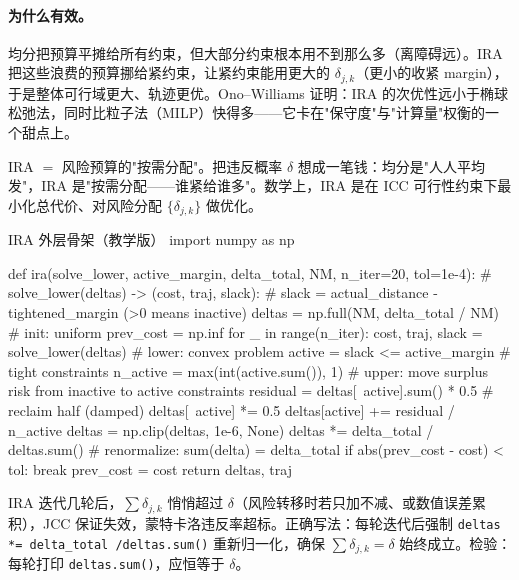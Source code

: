 \paragraph{为什么有效。}
均分把预算平摊给所有约束，但大部分约束根本用不到那么多（离障碍远）。IRA 把这些浪费的预算挪给紧约束，让紧约束能用更大的 $\delta_{j,k}$（更小的收紧 margin），于是整体可行域更大、轨迹更优。Ono--Williams\cite{ono2008iterative} 证明：IRA 的次优性远小于椭球松弛法，同时比粒子法（MILP）快得多——它卡在"保守度"与"计算量"权衡的一个甜点上。

\begin{insight}
IRA $=$ 风险预算的"按需分配"。把违反概率 $\delta$ 想成一笔钱：均分是"人人平均发"，IRA 是"按需分配——谁紧给谁多"。数学上，IRA 是在 ICC 可行性约束下最小化总代价、对风险分配 $\{\delta_{j,k}\}$ 做优化。
\end{insight}

\begin{codebox}[Python]{IRA 外层骨架（教学版）}
import numpy as np

def ira(solve_lower, active_margin, delta_total, NM, n_iter=20, tol=1e-4):
    # solve_lower(deltas) -> (cost, traj, slack):
    #   slack = actual_distance - tightened_margin (>0 means inactive)
    deltas = np.full(NM, delta_total / NM)         # init: uniform
    prev_cost = np.inf
    for _ in range(n_iter):
        cost, traj, slack = solve_lower(deltas)    # lower: convex problem
        active = slack <= active_margin            # tight constraints
        n_active = max(int(active.sum()), 1)
        # upper: move surplus risk from inactive to active constraints
        residual = deltas[~active].sum() * 0.5     # reclaim half (damped)
        deltas[~active] *= 0.5
        deltas[active]  += residual / n_active
        deltas = np.clip(deltas, 1e-6, None)
        deltas *= delta_total / deltas.sum()       # renormalize: sum(delta) = delta_total
        if abs(prev_cost - cost) < tol:
            break
        prev_cost = cost
    return deltas, traj
\end{codebox}

\begin{pitfall}
IRA 迭代几轮后，$\sum\delta_{j,k}$ 悄悄超过 $\delta$（风险转移时若只加不减、或数值误差累积），JCC 保证失效，蒙特卡洛违反率超标。正确写法：每轮迭代后强制 \texttt{deltas *= delta\_total /\allowbreak  deltas.\allowbreak sum()} 重新归一化，确保 $\sum\delta_{j,k}=\delta$ 始终成立。检验：每轮打印 \texttt{deltas.\allowbreak sum()}，应恒等于 $\delta$。
\end{pitfall}

